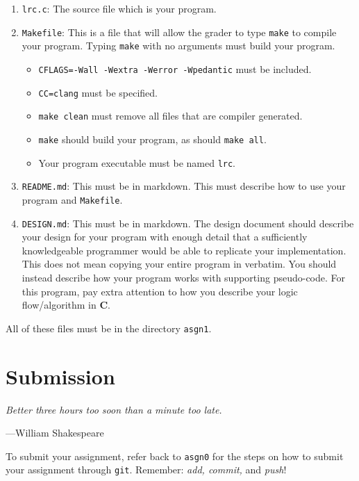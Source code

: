 \documentclass{article}
\newcommand\asgn[1]{asgn#1}
\begin{document}
\begin{enumerate}
\item \texttt{lrc.c}: The source file which is your program.

\item \texttt{Makefile}: This is a file that will allow the grader to type
    \texttt{make} to compile your program. Typing \texttt{make} with no
    arguments must build your program.
\begin{itemize}
\item \texttt{CFLAGS=-Wall -Wextra -Werror -Wpedantic} must be included.
\item \texttt{CC=clang} must be specified.
\item \texttt{make clean} must remove all files that are compiler generated.
\item \texttt{make} should build your program, as should \texttt{make all}.
\item Your program executable must be named \texttt{lrc}.
\end{itemize}

\item \texttt{README.md}: This must be in markdown.
This must describe how to use your program and \texttt{Makefile}.

\item \texttt{DESIGN.md}: This must be in markdown. The design document
should describe your design for your program with enough detail
that a sufficiently knowledgeable programmer would be able to
replicate your implementation. This does not mean copying your
entire program in verbatim. You should instead describe how your
program works with supporting pseudo-code. For this program, pay
extra attention to how you describe your logic flow/algorithm in
\textbf{C}.

\end{enumerate}

All of these files must be in the directory \texttt{\asgn{1}}.


\section{Submission}
\textwidth
\epigraph{\emph{Better three hours too soon than a minute too
late.}}{---William Shakespeare}

To submit your assignment, refer back to \texttt{\asgn{0}} for the steps on how to submit your assignment through \texttt{git}. Remember: \emph{add, commit,} and \emph{push}!
\end{document}
